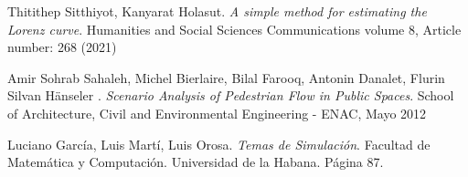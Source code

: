 \documentclass[12pt]{amsart}
\begin{document}
\begin{thebibliography}{99}
Thitithep Sitthiyot, Kanyarat Holasut. \emph{A simple method for estimating the Lorenz curve}.
		Humanities and Social Sciences Communications volume 8, Article number: 268 (2021)

Amir Sohrab Sahaleh, Michel Bierlaire, Bilal Farooq, Antonin Danalet, Flurin Silvan Hänseler . \emph{Scenario Analysis of Pedestrian Flow in Public Spaces}.
		School of Architecture, Civil and Environmental Engineering - ENAC, Mayo 2012

Luciano García,  Luis Martí, Luis Orosa. \emph{Temas de Simulación}.
		Facultad de Matemática y Computación. Universidad de la Habana. Página 87.

\end{thebibliography}
\smallskip
\smallskip
\end{document}
